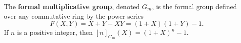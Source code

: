 The \textbf{formal multiplicative group}, denoted $G_m$, is the formal group defined over any commutative ring by the power series
$$
F(X,Y) = X + Y + XY = (1+X)(1+Y) - 1.
$$
If $n$ is a positive integer, then $[n]_{G_m}(X) = (1+X)^n - 1$.
